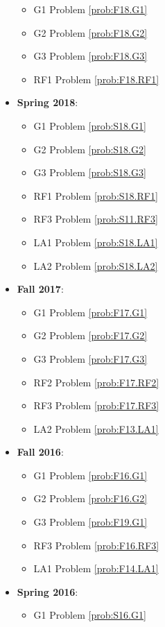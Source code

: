 \documentclass{article}
\theoremstyle{definition}
\begin{document}
\begin{itemize}
	\begin{itemize}
		\item G1 Problem \ref{prob:F18.G1}
		\item G2 Problem \ref{prob:F18.G2}
		\item G3 Problem \ref{prob:F18.G3}
		\item RF1 Problem \ref{prob:F18.RF1}
	\end{itemize}
	\item \textbf{Spring 2018}:
	\begin{itemize}
		\item G1 Problem \ref{prob:S18.G1}
		\item G2 Problem \ref{prob:S18.G2}
		\item G3 Problem \ref{prob:S18.G3}
		\item RF1 Problem \ref{prob:S18.RF1}
		\item RF3 Problem \ref{prob:S11.RF3}
		\item LA1 Problem \ref{prob:S18.LA1}
		\item LA2 Problem \ref{prob:S18.LA2}
	\end{itemize}
	\item \textbf{Fall 2017}:
	\begin{itemize}
		\item G1 Problem \ref{prob:F17.G1}
		\item G2 Problem \ref{prob:F17.G2}
		\item G3 Problem \ref{prob:F17.G3}
		\item RF2 Problem \ref{prob:F17.RF2}
		\item RF3 Problem \ref{prob:F17.RF3}
		\item LA2 Problem \ref{prob:F13.LA1}
	\end{itemize}
	\item \textbf{Fall 2016}:
	\begin{itemize}
		\item G1 Problem \ref{prob:F16.G1}
		\item G2 Problem \ref{prob:F16.G2}
		\item G3 Problem \ref{prob:F19.G1}
		\item RF3 Problem \ref{prob:F16.RF3}
		\item LA1 Problem \ref{prob:F14.LA1}
	\end{itemize}
	\item \textbf{Spring 2016}:
	\begin{itemize}
		\item G1 Problem \ref{prob:S16.G1}
	\end{itemize}

\end{itemize}
\end{document}
